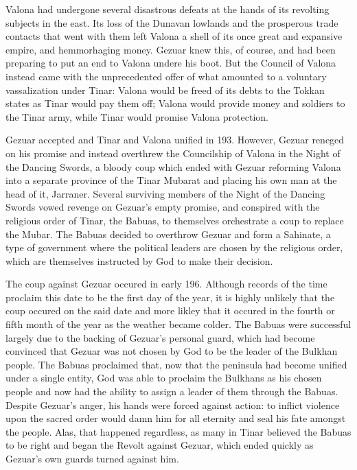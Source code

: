 Valona had undergone several disastrous defeats at the hands of its revolting subjects in the east. Its loss of the Dunavan lowlands and the prosperous trade contacts that went with them left Valona a shell of its once great and expansive empire, and hemmorhaging money. Gezuar knew this, of course, and had been preparing to put an end to Valona undere his boot. But the Council of Valona instead came with the unprecedented offer of what amounted to a voluntary vassalization under Tinar: Valona would be freed of its debts to the Tokkan states as Tinar would pay them off; Valona would provide money and soldiers to the Tinar army, while Tinar would promise Valona protection.

Gezuar accepted and Tinar and Valona unified in 193. However, Gezuar reneged on his promise and instead overthrew the Councilship of Valona in the Night of the Dancing Swords, a bloody coup which ended with Gezuar reforming Valona into a separate province of the Tinar Mubarat and placing his own man at the head of it, Jarraner. Several surviving members of the Night of the Dancing Swords vowed revenge on Gezuar's empty promise, and conspired with the religious order of Tinar, the Babuas, to themselves orchestrate a coup to replace the Mubar. The Babuas decided to overthrow Gezuar and form a Sahinate, a type of government where the political leaders are chosen by the religious order, which are themselves instructed by God to make their decision. 

The coup against Gezuar occured in early 196. Although records of the time proclaim this date to be the first day of the year, it is highly unlikely that the coup occured on the said date and more likley that it occured in the fourth or fifth month of the year as the weather became colder. The Babuas were successful largely due to the backing of Gezuar's personal guard, which had become convinced that Gezuar was not chosen by God to be the leader of the Bulkhan people. The Babuas proclaimed that, now that the peninsula had become unified under a single entity, God was able to proclaim the Bulkhans as his chosen people and now had the ability to assign a leader of them through the Babuas. Despite Gezuar's anger, his hands were forced against action: to inflict violence upon the sacred order would damn him for all eternity and seal his fate amongst the people. Alas, that happened regardless, as many in Tinar believed the Babuas to be right and began the Revolt against Gezuar, which ended quickly as Gezuar's own guards turned against him. 

